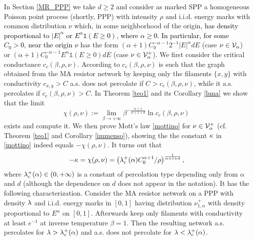 \documentclass[12pt,a4paper,reqno]{amsart}
\newcommand{\cV}{\ensuremath{\mathcal V}}
\let\a=\alpha \let\b=\beta   \let\d=\delta  \let\e=\varepsilon
\let\r=\rho  \let\s=\sigma \let\t=\tau   \let\th=\vartheta
\newcommand{\rosso}{\textcolor{black}} %
\newcommand{\be}{\begin{equation}}
\newcommand{\en}{\end{equation}}
\newcommand{\cv}{\rosso{\cV_\alpha}}
\newcommand{\cvp}{\rosso{\cV^+_\alpha}}
\begin{document}
 In Section \ref{MR_PPP} we  take $d\geq 2$ and  consider as  marked SPP  a homogeneous Poisson point process (shortly, PPP)  with intensity $\rho$ and i.i.d. energy marks   with common distribution $\nu$ which, in some neighborhood of the origin,
 \rosso{has density proportional to $|E|^\a$ or $E^\a \mathds{1}(E\geq 0)$, where $\a\geq 0$. In particular, for some $C_0>0$, near the origin $\nu$}
    has   the form $(\a+1) C_0^{-\a-1}2^{-1} |E|^\a dE$ (case $\nu\in \cv$)  or $(\a+1)C_0^{-\a-1} E^\a \mathds{1}(E\geq 0) dE$  (case $\nu\in \cvp$).
We first consider 
  the critical conductance $c_c(\beta, \rho,\nu)$. According to \cite{AHL}  $c_c(\beta, \rho,\nu)$ is such that the graph obtained from the MA resistor network by keeping only the filaments  $\{x,y\}$ 
with conductivity $c_{x,y}>C$ a.s. does not percolate if $C>c_c(\beta, \rho,\nu)$, while it  a.s. percolates if $c_c(\beta, \rho,\nu)>C$.  In Theorem \ref{teo1} and its Corollary \ref{luna} we show that the limit 
\[ \chi(\rho, \nu):=\lim _{\b\to +\infty} \b^{- \frac{\a+1}{\a+1+d} } \ln c_c(\b,\rho,\nu )\,\] exists and compute it. 
We then prove Mott's law \eqref{mottino} for $\nu\in \cvp$ (cf. Theorem \ref{teo1} and  Corollary  \ref{immenso}), showing the the constant $\kappa$ in \eqref{mottino} indeed equals $- \chi(\rho, \nu)$. It turns out that 
\be\label{eccolino}
-\k=\chi(\rho,\nu) =\bigl( {\l_c^+(\a)   C_0^{\a+1}/\r}\bigr)^{\frac{1}{\a+1+d}}\,,
\en
where $\l_c^+(\a)\in (0,+\infty) $ is a constant of percolation type  depending  only from $\a$ and $d$ (although the dependence on $d$ does not appear in the notation). It has the following characterization.  Consider the MA resistor network on a PPP with density $\lambda$ and  i.i.d. energy  marks   in $[0,1]$ having  distribution $\nu_{1,\a}^+$  with  density proportional to $E^\a$ on $[0,1]$. Afterwards keep only filaments with conductivity at least $e^{-1}$ at inverse temperature $\b=1$. Then  the resulting network a.s. percolates for $\l>\l_c^+(\a)$ and a.s. does not percolate for $\l<\l_c^+(\a)$.


\smallskip
\end{document}
